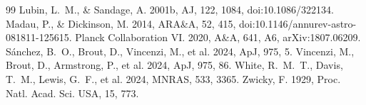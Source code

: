 \documentclass[11pt]{article}
\begin{document}
\begin{thebibliography}{99}
 Lubin, L.~M., \& Sandage, A. 2001b, AJ, 122, 1084, doi:10.1086/322134.
 Madau, P., \& Dickinson, M. 2014, ARA\&A, 52, 415, doi:10.1146/annurev-astro-081811-125615.
 Planck Collaboration VI. 2020, A\&A, 641, A6, arXiv:1807.06209.
 S\'anchez, B.~O., Brout, D., Vincenzi, M., et al. 2024, ApJ, 975, 5.
 Vincenzi, M., Brout, D., Armstrong, P., et al. 2024, ApJ, 975, 86.
 White, R.~M.~T., Davis, T.~M., Lewis, G.~F., et al. 2024, MNRAS, 533, 3365.
 Zwicky, F. 1929, Proc. Natl. Acad. Sci. USA, 15, 773.
\end{thebibliography}
\end{document}
